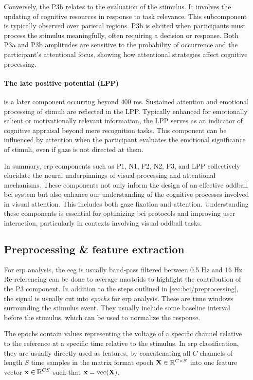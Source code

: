 Conversely, the P3b relates to the evaluation of the stimulus.
It involves the updating of cognitive resources in response to task relevance.
This subcomponent is typically observed over parietal regions.
P3b is elicited when participants must process the stimulus meaningfully, often
requiring a decision or response.
Both P3a and P3b amplitudes are sensitive to the probability of occurrence and the
participant's attentional focus, showing how attentional strategies affect cognitive
processing.

\paragraph{The late positive potential (LPP)} is a later component occurring beyond 400 ms.
Sustained attention and emotional processing of stimuli are reflected in the LPP.
Typically enhanced for emotionally salient or motivationally relevant information, the
LPP serves as an indicator of cognitive appraisal beyond mere recognition tasks.
This component can be influenced by attention when the participant evaluates the
emotional significance of stimuli, even if gaze is not directed at them.

In summary, \ac{erp} components such as P1, N1, P2, N2, P3, and LPP collectively
elucidate the neural underpinnings of visual processing and attentional mechanisms.
These components not only inform the design of an effective oddball \ac{bci} system but
also enhance our understanding of the cognitive processes involved in visual attention.
This includes both gaze fixation and attention.
Understanding these components is essential for optimizing \ac{bci} protocols and
improving user interaction, particularly in contexts involving visual oddball tasks.


\subsection{Preprocessing \& feature extraction}
For \ac{erp} analysis, the \ac{eeg} is usually band-pass filtered between 0.5 Hz and
16 Hz.
Re-referencing can be done to average mastoids to highlight the contribution of the P3
component.
In addition to the steps outlined in \cref{sec:bci/preprocessing}, the signal is
usually cut into \emph{epochs} for \ac{erp} analysis.
These are time windows surrounding the stimulus event.
They usually include some baseline interval before the stimulus, which can be used to
normalize the response.

The epochs contain values representing the voltage of a specific channel relative to the
reference at a specific time relative to the stimulus.
In \ac{erp} classification, they are usually directly used as features, by concatenating
all $C$ channels of length $S$ time samples in the matrix format epoch
$\mathbf{X}\in\mathbb{R}^{C\times S}$ into one feature vector
$\mathbf{x}\in\mathbb{R}^{CS}$ such that $\mathbf{x} = \text{vec}(\mathbf{X})$.

